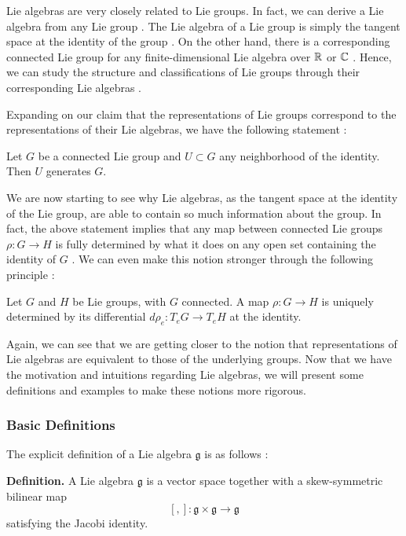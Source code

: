 \documentclass[11pt, a4paper, oneside]{article}
\theoremstyle{plain}
\theoremstyle{definition}
\theoremstyle{example}
\begin{document}
Lie algebras are very closely related to Lie groups. In fact, we can derive a Lie algebra from any Lie group \cite{liealgebrawiki}. The Lie algebra of a Lie group is simply the tangent space at the identity of the group \cite{liealgebrawiki}. On the other hand, there is a corresponding connected Lie group for any finite-dimensional Lie algebra over $\mathbb{R}$ or $\mathbb{C}$ \cite{liealgebrawiki}. Hence, we can study the structure and classifications of Lie groups through their corresponding Lie algebras \cite{liealgebrawiki}.

\par
Expanding on our claim that the representations of Lie groups correspond to the representations of their Lie algebras, we have the following statement \cite[\S 8.1, Exercise 8.1]{fulton}:

\par
Let $G$ be a connected Lie group and $U \subset G$ any neighborhood of the identity. Then $U$ generates $G$.

\par
We are now starting to see why Lie algebras, as the tangent space at the identity of the Lie group, are able to contain so much information about the group. In fact, the above statement implies that any map between connected Lie groups $\rho: G \to H$ is fully determined by what it does on any open set containing the identity of $G$ \cite[\S 8.1]{fulton}. We can even make this notion stronger through the following principle \cite[\S 8.1]{fulton}:

\par
Let $G$ and $H$ be Lie groups, with $G$ connected. A map $\rho: G \to H$ is uniquely determined by its differential $d\rho_e: T_eG \to T_eH$ at the identity.

\par
Again, we can see that we are getting closer to the notion that representations of Lie algebras are equivalent to those of the underlying groups. Now that we have the motivation and intuitions regarding Lie algebras, we will present some definitions and examples to make these notions more rigorous.

\subsubsection{Basic Definitions}

The explicit definition of a Lie algebra $\mathfrak{g}$ is as follows \cite[\S 8.1, Definition 8.9]{fulton}:

\par
\textbf{Definition.} A Lie algebra $\mathfrak{g}$ is a vector space together with a skew-symmetric bilinear map $$[,]: \mathfrak{g} \times \mathfrak{g} \to \mathfrak{g}$$ satisfying the Jacobi identity.
\end{document}
